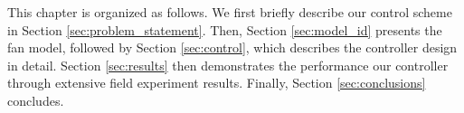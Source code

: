This chapter is organized as follows. We first briefly describe our control scheme in Section \ref{sec:problem_statement}. 
Then, Section \ref{sec:model_id} presents the fan model, followed by Section \ref{sec:control}, which describes the controller design in detail. Section \ref{sec:results} then demonstrates the performance our controller through extensive field experiment results.
Finally, Section \ref{sec:conclusions} concludes.













